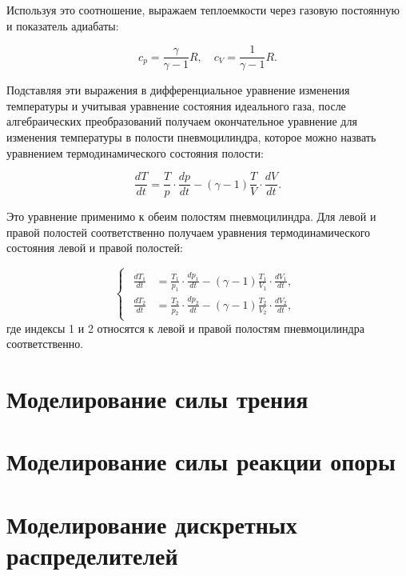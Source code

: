 Используя это соотношение, выражаем теплоемкости через газовую постоянную и показатель адиабаты:

\begin{equation*}
    c_p = \frac{\gamma}{\gamma - 1} R, \quad c_V = \frac{1}{\gamma - 1} R.
\end{equation*}

Подставляя эти выражения в дифференциальное уравнение изменения температуры и учитывая уравнение состояния идеального газа, после алгебраических преобразований получаем окончательное уравнение для изменения температуры в полости пневмоцилиндра, которое можно назвать уравнением термодинамического состояния полости:

\begin{equation*}
    \frac{dT}{dt} = \frac{T}{p} \cdot \frac{dp}{dt} - (\gamma - 1) \frac{T}{V} \cdot \frac{dV}{dt}.
\end{equation*}

Это уравнение применимо к обеим полостям пневмоцилиндра. Для левой и правой полостей соответственно
получаем уравнения термодинамического состояния левой и правой полостей:

\begin{equation*}
    \begin{cases}
        \begin{aligned}
            \frac{dT_1}{dt} & = \frac{T_1}{p_1} \cdot \frac{dp_1}{dt} - (\gamma - 1) \frac{T_1}{V_1} \cdot \frac{dV_1}{dt}, \\
            \frac{dT_2}{dt} & = \frac{T_2}{p_2} \cdot \frac{dp_2}{dt} - (\gamma - 1) \frac{T_2}{V_2} \cdot \frac{dV_2}{dt},
        \end{aligned}
    \end{cases}
\end{equation*}
где индексы 1 и 2 относятся к левой и правой полостям пневмоцилиндра соответственно.



\section{Моделирование силы трения}\label{sec:ch2/sec2/subsec4}

\section{Моделирование силы реакции опоры}\label{sec:ch2/sec2/subsec5}

\section{Моделирование дискретных распределителей}\label{sec:ch2/sec3}

